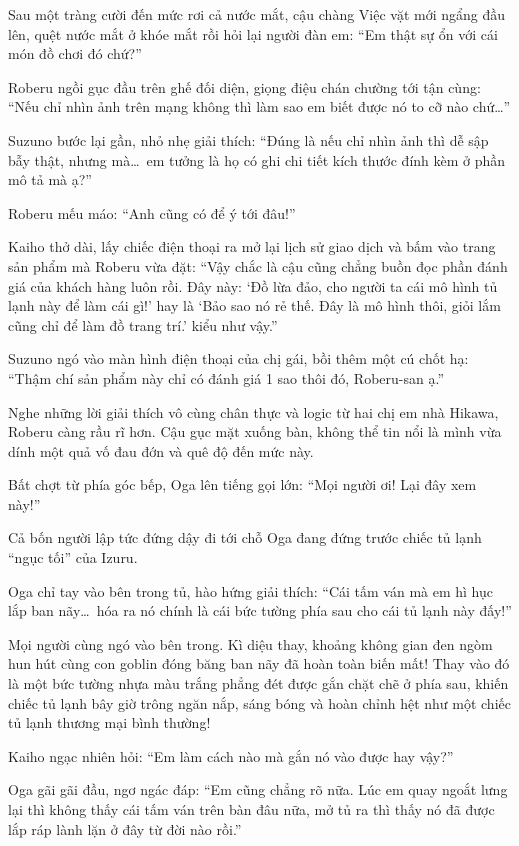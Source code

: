 \documentclass[../main.tex]{subfiles}
\begin{document}
Sau một tràng cười đến mức rơi cả nước mắt, cậu chàng Việc vặt mới ngẩng đầu lên, quệt nước mắt ở khóe mắt rồi hỏi lại người đàn em: ``Em thật sự ổn với cái món đồ chơi đó chứ?''

Roberu ngồi gục đầu trên ghế đối diện, giọng điệu chán chường tới tận cùng: ``Nếu chỉ nhìn ảnh trên mạng không thì làm sao em biết được nó to cỡ nào chứ\dots''

Suzuno bước lại gần, nhỏ nhẹ giải thích: ``Đúng là nếu chỉ nhìn ảnh thì dễ sập bẫy thật, nhưng mà\dots\ em tưởng là họ có ghi chi tiết kích thước đính kèm ở phần mô tả mà ạ?''

Roberu mếu máo: ``Anh cũng có để ý tới đâu!''

Kaiho thở dài, lấy chiếc điện thoại ra mở lại lịch sử giao dịch và bấm vào trang sản phẩm mà Roberu vừa đặt: ``Vậy chắc là cậu cũng chẳng buồn đọc phần đánh giá của khách hàng luôn rồi. Đây này: `Đồ lừa đảo, cho người ta cái mô hình tủ lạnh này để làm cái gì!' hay là `Bảo sao nó rẻ thế. Đây là mô hình thôi, giỏi lắm cũng chỉ để làm đồ trang trí.' kiểu như vậy.''

Suzuno ngó vào màn hình điện thoại của chị gái, bồi thêm một cú chốt hạ: ``Thậm chí sản phẩm này chỉ có đánh giá 1 sao thôi đó, Roberu-san ạ.''

Nghe những lời giải thích vô cùng chân thực và logic từ hai chị em nhà Hikawa, Roberu càng rầu rĩ hơn. Cậu gục mặt xuống bàn, không thể tin nổi là mình vừa dính một quả vố đau đớn và quê độ đến mức này.

Bất chợt từ phía góc bếp, Oga lên tiếng gọi lớn: ``Mọi người ơi! Lại đây xem này!''

Cả bốn người lập tức đứng dậy đi tới chỗ Oga đang đứng trước chiếc tủ lạnh ``ngục tối'' của Izuru.

Oga chỉ tay vào bên trong tủ, hào hứng giải thích: ``Cái tấm ván mà em hì hục lắp ban nãy\dots\ hóa ra nó chính là cái bức tường phía sau cho cái tủ lạnh này đấy!''

Mọi người cùng ngó vào bên trong. Kì diệu thay, khoảng không gian đen ngòm hun hút cùng con goblin đóng băng ban nãy đã hoàn toàn biến mất! Thay vào đó là một bức tường nhựa màu trắng phẳng đét được gắn chặt chẽ ở phía sau, khiến chiếc tủ lạnh bây giờ trông ngăn nắp, sáng bóng và hoàn chỉnh hệt như một chiếc tủ lạnh thương mại bình thường!


Kaiho ngạc nhiên hỏi: ``Em làm cách nào mà gắn nó vào được hay vậy?''

Oga gãi gãi đầu, ngơ ngác đáp: ``Em cũng chẳng rõ nữa. Lúc em quay ngoắt lưng lại thì không thấy cái tấm ván trên bàn đâu nữa, mở tủ ra thì thấy nó đã được lắp ráp lành lặn ở đây từ đời nào rồi.''
\end{document}
